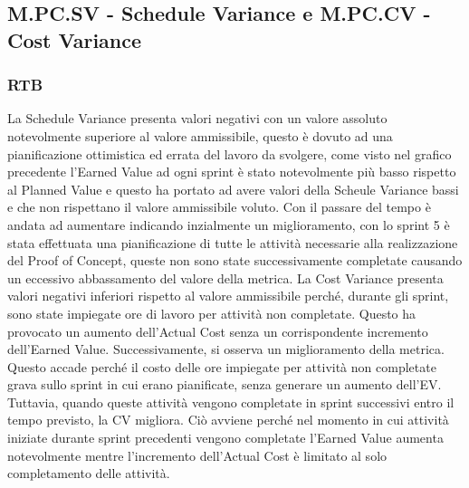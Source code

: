 \subsection{M.PC.SV - Schedule Variance e M.PC.CV - Cost Variance}

\subsubsection{RTB}
La Schedule Variance presenta valori negativi con un valore assoluto notevolmente superiore al valore ammissibile, questo è dovuto ad una pianificazione
ottimistica ed errata del lavoro da svolgere, come visto nel grafico precedente l'Earned Value ad ogni sprint è stato notevolmente più basso rispetto al Planned Value
e questo ha portato ad avere valori della Scheule Variance bassi e che non rispettano il valore ammissibile voluto.
Con il passare del tempo è andata ad aumentare indicando inzialmente un miglioramento, con lo sprint 5 è stata effettuata una pianificazione di tutte le attività
necessarie alla realizzazione del Proof of Concept, queste non sono state successivamente completate causando un eccessivo abbassamento del valore della metrica.
La Cost Variance presenta valori negativi inferiori rispetto al valore ammissibile perché, durante gli sprint, sono state impiegate ore di lavoro per attività non completate. 
Questo ha provocato un aumento dell'Actual Cost senza un corrispondente incremento dell'Earned Value.
Successivamente, si osserva un miglioramento della metrica. Questo accade perché il costo delle ore impiegate per attività non completate grava sullo sprint in cui erano pianificate, 
senza generare un aumento dell'EV. Tuttavia, quando queste attività vengono completate in sprint successivi entro il tempo previsto, la CV migliora.
Ciò avviene perché nel momento in cui attività iniziate durante sprint precedenti vengono completate l'Earned Value aumenta notevolmente mentre l'incremento dell'Actual Cost è limitato al solo completamento delle attività.
